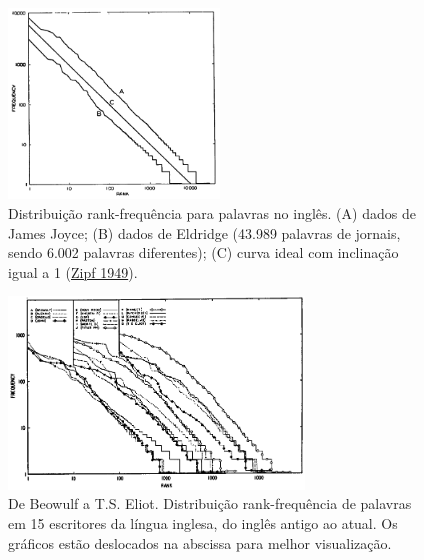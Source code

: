 \documentclass[
  ignorenonframetext,
  aspectratio=169]{beamer}
\begin{document}
\begin{frame}
\begin{figure}
\centering
\includegraphics[width=0.5\textwidth,height=\textheight]{zipf-fig2-1-ulysses.png}
\caption{Distribuição rank-frequência para palavras no inglês. (A) dados
de James Joyce; (B) dados de Eldridge (43.989 palavras de jornais, sendo
6.002 palavras diferentes); (C) curva ideal com inclinação igual a 1
(\protect\hyperlink{ref-zipf1949}{Zipf 1949}).}
\end{figure}

\end{frame}

\begin{frame}
\begin{figure}
\centering
\includegraphics[width=0.7\textwidth,height=\textheight]{zipf-fig3-14.png}
\caption{De Beowulf a T.S. Eliot. Distribuição rank-frequência de
palavras em 15 escritores da língua inglesa, do inglês antigo ao atual.
Os gráficos estão deslocados na abscissa para melhor visualização.}
\end{figure}
\end{frame}
\end{document}
